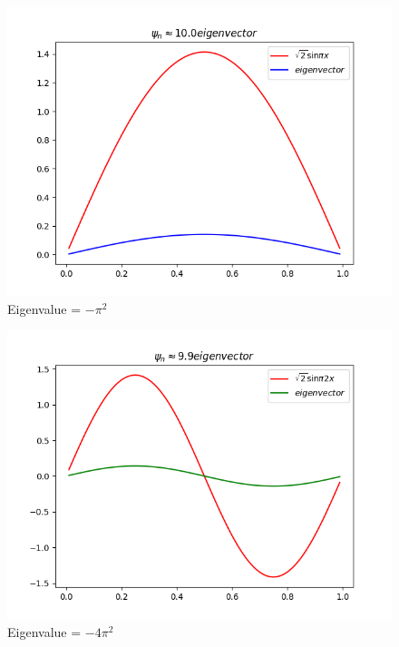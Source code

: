 \documentclass[10pt]{article}
\begin{document}
\begin{enumerate}[label=2.\arabic*]
	\begin{figure}[H]
		\centering
		\includegraphics[scale=0.7]{Eigenvectors/eigen_vector1.png}
		\caption{Eigenvalue = $-\pi^{2}$}
	\end{figure}
	\begin{figure}[H]
		\centering
		\includegraphics[scale=0.7]{Eigenvectors/eigen_vector2.png}
		\caption{Eigenvalue = $-4\pi^{2}$}
	\end{figure}
	\begin{figure}[H]
		\centering

\end{figure}
\end{enumerate}
\end{document}

